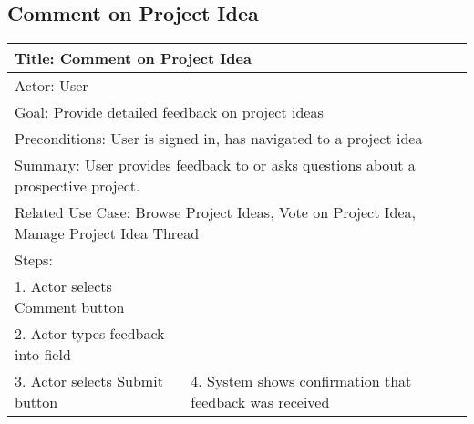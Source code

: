 \documentclass[10pt,a4paper]{article}
\begin{document}
\subsection{Comment on Project Idea	}
\begin{tabular}{|p{6cm}|p{6cm}|} \hline
\multicolumn{2}{|p{12cm}|}{Title: Comment on Project Idea	}                                                                                       \\ \hline
\multicolumn{2}{|p{12cm}|}{Actor: User	}                                                                                                       \\ \hline
\multicolumn{2}{|p{12cm}|}{Goal: Provide detailed feedback on project ideas	} \\ \hline
\multicolumn{2}{|p{12cm}|}{Preconditions: User is signed in, has navigated to a project idea	}                                                                                               \\ \hline
\multicolumn{2}{|p{12cm}|}{Summary: User provides feedback to or asks questions about a prospective project.	}                           \\ \hline
\multicolumn{2}{|p{12cm}|}{Related Use Case: Browse Project Ideas, Vote on Project Idea, Manage Project Idea Thread	}                               \\ \hline
Steps:                                                                              &                                                 \\ \hline
1. Actor selects Comment button &                                                 \\ \hline
2. Actor types feedback into field      &                                                 \\ \hline
3. Actor selects Submit button&                 
4. System shows confirmation that feedback was received                                 \\ \hline


\end{tabular}
\end{document}
